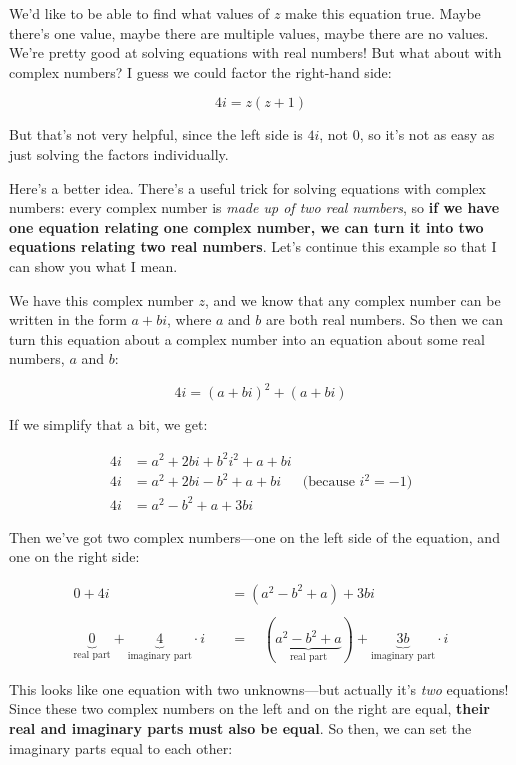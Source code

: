\documentclass[
]{article}
\begin{document}
We'd like to be able to find what values of \(z\) make this equation
true. Maybe there's one value, maybe there are multiple values, maybe
there are no values. We're pretty good at solving equations with real
numbers! But what about with complex numbers? I guess we could factor
the right-hand side:

\[4i = z(z+1)\]

But that's not very helpful, since the left side is \(4i\), not \(0\),
so it's not as easy as just solving the factors individually.

Here's a better idea. There's a useful trick for solving equations with
complex numbers: every complex number is \emph{made up of two real
numbers}, so \textbf{if we have one equation relating one complex
number, we can turn it into two equations relating two real numbers}.
Let's continue this example so that I can show you what I mean.

We have this complex number \(z\), and we know that any complex number
can be written in the form \(a+bi\), where \(a\) and \(b\) are both real
numbers. So then we can turn this equation about a complex number into
an equation about some real numbers, \(a\) and \(b\):

\[4i = (a+bi)^2 + (a+bi)\]

If we simplify that a bit, we get:

\[
\begin{align*}
4i &= a^2 + 2bi + b^2i^2 +a+bi \\
4i&= a^2 + 2bi - b^2 + a + bi &\text{(because $i^2=-1$)}\\
4i&= a^2 - b^2 + a + 3bi
\end{align*}
\]

Then we've got two complex numbers---one on the left side of the
equation, and one on the right side:

\[
\begin{align*}
0+4i &= \left(a^2 - b^2 + a\right) + 3bi\\ \\
\underbrace{0}_{\text{real part}} + \underbrace{4}_{\text{imaginary part}}\cdot i \quad&=\quad (\underbrace{a^2 - b^2 + a}_{\text{real part}}) +\underbrace{3b}_{\text{imaginary part}}\cdot i
\end{align*}
\]

This looks like one equation with two unknowns---but actually it's
\emph{two} equations! Since these two complex numbers on the left and on
the right are equal, \textbf{their real and imaginary parts must also be
equal}. So then, we can set the imaginary parts equal to each other:
\end{document}
